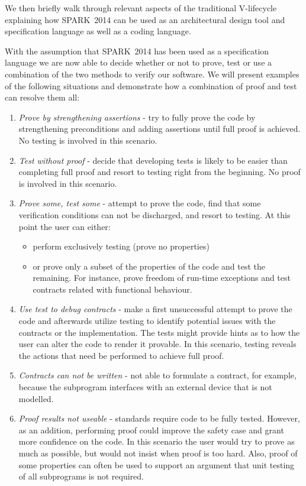 \documentclass[paperletter]{sig-alternate-2013}
\newcommand{\newspark}{SPARK~2014\xspace}
\begin{document}
We then briefly walk through relevant aspects of the traditional
V-lifecycle explaining how \newspark can be used as an architectural
design tool and specification language as well as a coding language.

With the assumption that \newspark has been used as a specification
language we are now able to decide whether or not to prove, test or
use a combination of the two methods to verify our software.  We will
present examples of the following situations and demonstrate how a
combination of proof and test can resolve them all:
\begin{enumerate}
\item \emph{Prove by strengthening assertions} - try to fully prove
  the code by strengthening preconditions and adding assertions until
  full proof is achieved. No testing is involved in this scenario.

\item \emph{Test without proof} - decide that developing tests is
  likely to be easier than completing full proof and resort to testing
  right from the beginning. No proof is involved in this scenario.

\item \emph{Prove some, test some} - attempt to prove the code, find
  that some verification conditions can not be discharged, and resort
  to testing. At this point the user can either:
  \begin{itemize}
  \item perform exclusively testing (prove no properties)
  \item or prove only a subset of the properties of the code and test
    the remaining. For instance, prove freedom of run-time exceptions
    and test contracts related with functional behaviour.
  \end{itemize}

\item \emph{Use test to debug contracts} - make a first unsuccessful
  attempt to prove the code and afterwards utilize testing to identify
  potential issues with the contracts or the implementation. The tests
  might provide hints as to how the user can alter the code to render
  it provable. In this scenario, testing reveals the actions that need
  be performed to achieve full proof.

\item \emph{Contracts can not be written} - not able to formulate a
  contract, for example, because the subprogram interfaces with an
  external device that is not modelled.

\item \emph{Proof results not useable} - standards require code to
  be fully tested. However, as an addition, performing proof could
  improve the safety case and grant more confidence on the code. In
  this scenario the user would try to prove as much as possible, but
  would not insist when proof is too hard. Also, proof of some
  properties can often be used to support an argument that
  unit testing of all subprograms is not required.

\end{enumerate}
\end{document}
